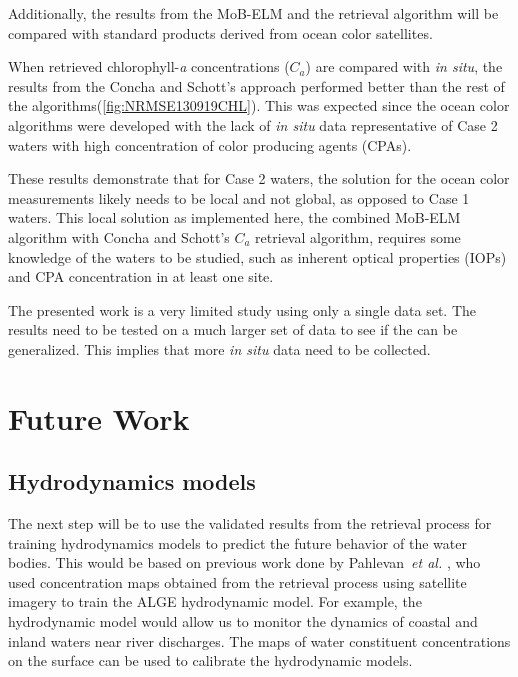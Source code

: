 Additionally, the results from the MoB-ELM and the retrieval algorithm will be compared with standard products derived from ocean color satellites.




When retrieved chlorophyll-{\it a} concentrations ($C_a$) are compared with {\it in situ}, the results from the Concha and Schott's approach performed better than the rest of the algorithms(\autoref{fig:NRMSE130919CHL}). This was expected since the ocean color algorithms were developed with the lack of {\it in situ} data representative of Case 2 waters with high concentration of color producing agents (CPAs).

These results demonstrate that for Case 2 waters, the solution for the ocean color measurements likely needs to be local and not global, as opposed to Case 1 waters. This local solution as implemented here, the combined MoB-ELM algorithm with Concha and Schott's $C_a$ retrieval algorithm, requires some knowledge of the waters to be studied, such as inherent optical properties (IOPs) and CPA concentration in at least one site.

The presented work is a very limited study using only a single data set. The results need to be tested on a much larger set of data to see if the can be generalized. This implies that more {\it in situ} data need to be collected.

\section{Future Work}
\label{sec:futurework}
\subsection{Hydrodynamics models} 
The next step will be to use the validated results from the retrieval process for training hydrodynamics models to predict the future behavior of the water bodies. This would be based on previous work done by Pahlevan~{\it et al.} \cite{Pahlevan:2012b}, who used concentration maps obtained from the retrieval process using satellite imagery to train the ALGE hydrodynamic model. For example, the hydrodynamic model would allow us to monitor the dynamics of coastal and inland waters near river discharges. The maps of water constituent concentrations on the surface can be used to calibrate the hydrodynamic models.

